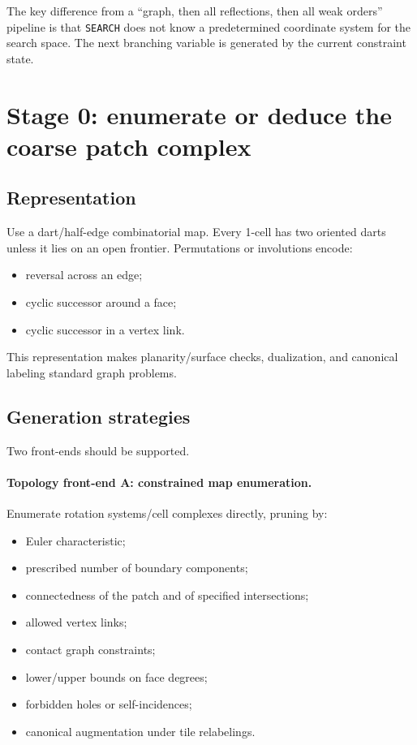 \documentclass[11pt]{article}
\begin{document}
The key difference from a ``graph, then all reflections, then all weak orders'' pipeline is that \texttt{SEARCH} does not know a predetermined coordinate system for the search space.  The next branching variable is generated by the current constraint state.

\section{Stage 0: enumerate or deduce the coarse patch complex}
\label{sec:topology}

\subsection{Representation}

Use a dart/half-edge combinatorial map.  Every 1-cell has two oriented darts unless it lies on an open frontier.  Permutations or involutions encode:
\begin{itemize}
  \item reversal across an edge;
  \item cyclic successor around a face;
  \item cyclic successor in a vertex link.
\end{itemize}
This representation makes planarity/surface checks, dualization, and canonical labeling standard graph problems.

\subsection{Generation strategies}

Two front-ends should be supported.

\paragraph{Topology front-end A: constrained map enumeration.}
Enumerate rotation systems/cell complexes directly, pruning by:
\begin{itemize}
  \item Euler characteristic;
  \item prescribed number of boundary components;
  \item connectedness of the patch and of specified intersections;
  \item allowed vertex links;
  \item contact graph constraints;
  \item lower/upper bounds on face degrees;
  \item forbidden holes or self-incidences;
  \item canonical augmentation under tile relabelings.
\end{itemize}
\end{document}
